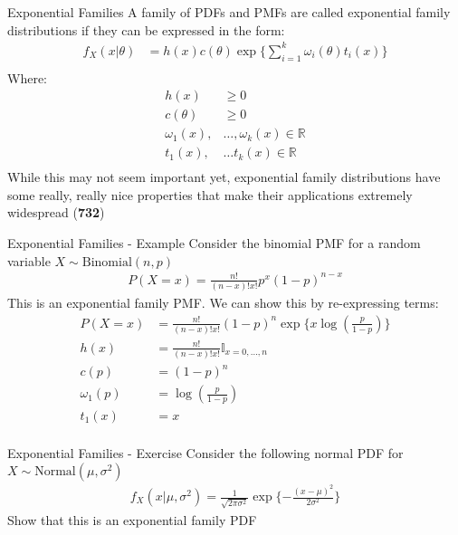 \documentclass{beamer}
\begin{document}
\begin{frame}{Exponential Families}
A family of PDFs and PMFs are called exponential family distributions if they can be expressed in the form:
\begin{align*}
f_{X}(x|\theta) &= h(x) c(\theta)\exp\{\sum_{i = 1}^{k}\omega_{i}(\theta)t_{i}(x)\}\\
\end{align*}
Where:
\begin{align*}
h(x) &\geq 0 \\
c(\theta) &\geq 0 \\
\omega_{1}(x),&\ldots,\omega_{k}(x) \in \mathbb{R}\\
t_{1}(x),&\ldots t_{k}(x) \in \mathbb{R}\\
\end{align*}
While this may not seem important yet, exponential family distributions have some really, really nice properties that make their applications extremely widespread (\textbf{732})

\end{frame}

\begin{frame}{Exponential Families - Example}
Consider the binomial PMF for a random variable $X\sim\mathrm{Binomial}(n, p)$
\begin{align*}
P(X = x) = \frac{n!}{(n - x)!x!} p^{x} (1-p)^{n-x}
\end{align*}
This is an exponential family PMF. We can show this by re-expressing terms:
\begin{align*}
P(X = x) &= \frac{n!}{(n - x)!x!} (1-p)^{n} \exp\{x\log(\frac{p}{1-p}) \} \\
h(x) &= \frac{n!}{(n - x)!x!} \mathbb{I}_{x = 0, \ldots, n}\\
c(p) &= (1-p)^{n} \\
\omega_{1}(p) &= \log(\frac{p}{1-p}) \\
t_{1}(x) &= x \\
\end{align*}
\end{frame}

\begin{frame}{Exponential Families - Exercise}
Consider the following normal PDF for $X\sim\mathrm{Normal}(\mu, \sigma^{2})$
\begin{align*}
f_{X}(x|\mu, \sigma^{2}) = \frac{1}{\sqrt{2\pi\sigma^{2}}}\exp\{-\frac{(x-\mu)^{2}}{2\sigma^{2}}\} 
\end{align*}
Show that this is an exponential family PDF
\end{frame}
\end{document}
